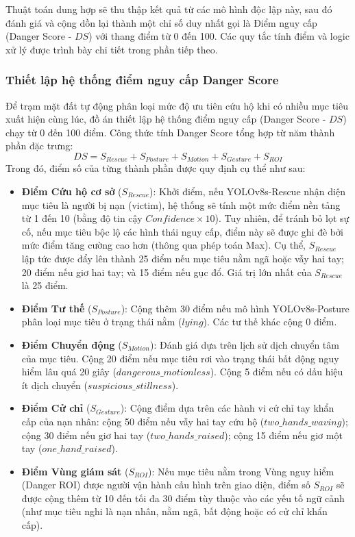 Thuật toán dung hợp sẽ thu thập kết quả từ các mô hình độc lập này, sau đó đánh giá và cộng dồn lại thành một chỉ số duy nhất gọi là Điểm nguy cấp (Danger Score - $DS$) với thang điểm từ 0 đến 100. Các quy tắc tính điểm và logic xử lý được trình bày chi tiết trong phần tiếp theo.

\subsubsection{Thiết lập hệ thống điểm nguy cấp Danger Score}

Để trạm mặt đất tự động phân loại mức độ ưu tiên cứu hộ khi có nhiều mục tiêu xuất hiện cùng lúc, đồ án thiết lập hệ thống điểm nguy cấp (Danger Score - $DS$) chạy từ 0 đến 100 điểm. Công thức tính Danger Score tổng hợp từ năm thành phần đặc trưng:
\begin{equation}
DS = S_{Rescue} + S_{Posture} + S_{Motion} + S_{Gesture} + S_{ROI}
\label{eq:danger_score}
\end{equation}
Trong đó, điểm số của từng thành phần được quy định cụ thể như sau:
\begin{itemize}
    \item \textbf{Điểm Cứu hộ cơ sở} ($S_{Rescue}$): Khởi điểm, nếu YOLOv8s-Rescue nhận diện mục tiêu là người bị nạn (victim), hệ thống sẽ tính một mức điểm nền tảng từ 1 đến 10 (bằng độ tin cậy $Confidence \times 10$). Tuy nhiên, để tránh bỏ lọt sự cố, nếu mục tiêu bộc lộ các hình thái nguy cấp, điểm này sẽ được ghi đè bởi mức điểm tăng cường cao hơn (thông qua phép toán Max). Cụ thể, $S_{Rescue}$ lập tức được đẩy lên thành 25 điểm nếu mục tiêu nằm ngã hoặc vẫy hai tay; 20 điểm nếu giơ hai tay; và 15 điểm nếu gục đổ. Giá trị lớn nhất của $S_{Rescue}$ là 25 điểm.
    \item \textbf{Điểm Tư thế} ($S_{Posture}$): Cộng thêm 30 điểm nếu mô hình YOLOv8s-Posture phân loại mục tiêu ở trạng thái nằm ($lying$). Các tư thế khác cộng 0 điểm.
    \item \textbf{Điểm Chuyển động} ($S_{Motion}$): Đánh giá dựa trên lịch sử dịch chuyển tâm của mục tiêu. Cộng 20 điểm nếu mục tiêu rơi vào trạng thái bất động nguy hiểm lâu quá 20 giây ($dangerous\_motionless$). Cộng 5 điểm nếu có dấu hiệu ít dịch chuyển ($suspicious\_stillness$).
    \item \textbf{Điểm Cử chỉ} ($S_{Gesture}$): Cộng điểm dựa trên các hành vi cử chỉ tay khẩn cấp của nạn nhân: cộng 50 điểm nếu vẫy hai tay cứu hộ ($two\_hands\_waving$); cộng 30 điểm nếu giơ hai tay ($two\_hands\_raised$); cộng 15 điểm nếu giơ một tay ($one\_hand\_raised$).
    \item \textbf{Điểm Vùng giám sát} ($S_{ROI}$): Nếu mục tiêu nằm trong Vùng nguy hiểm (Danger ROI) được người vận hành cấu hình trên giao diện, điểm số $S_{ROI}$ sẽ được cộng thêm từ 10 đến tối đa 30 điểm tùy thuộc vào các yếu tố ngữ cảnh (như mục tiêu nghi là nạn nhân, nằm ngã, bất động hoặc có cử chỉ khẩn cấp).
\end{itemize}


